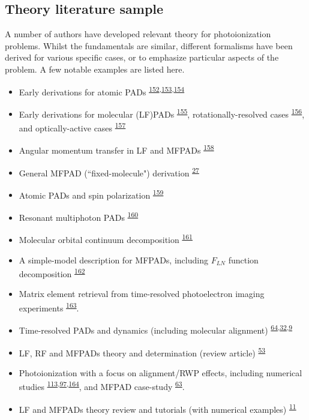 \documentclass[10pt]{article}
\begin{document}

\subsection{Theory literature sample\label{sec:theory-lit}}

A number of authors have developed relevant theory for photoionization problems. Whilst the fundamentals are similar, different formalisms have been derived for various specific cases, or to emphasize particular aspects of the problem. A few notable examples are listed here.

\begin{itemize}
\item Early derivations for atomic PADs \textsuperscript{\hyperref[csl:152]{152},\hyperref[csl:153]{153},\hyperref[csl:154]{154}}
\item Early derivations for molecular (LF)PADs \textsuperscript{\hyperref[csl:155]{155}}, rotationally-resolved cases \textsuperscript{\hyperref[csl:156]{156}}, and optically-active cases \textsuperscript{\hyperref[csl:157]{157}}
\item Angular momentum transfer in LF and MFPADs \textsuperscript{\hyperref[csl:158]{158}} 
\item General MFPAD (``fixed-molecule") derivation \textsuperscript{\hyperref[csl:27]{27}}
\item Atomic PADs and spin polarization \textsuperscript{\hyperref[csl:159]{159}}
\item Resonant multiphoton PADs \textsuperscript{\hyperref[csl:160]{160}}
\item Molecular orbital continuum decomposition \textsuperscript{\hyperref[csl:161]{161}}
\item A simple-model description for MFPADs, including $F_{LN}$ function decomposition \textsuperscript{\hyperref[csl:162]{162}}
\item Matrix element retrieval from time-resolved photoelectron imaging experiments \textsuperscript{\hyperref[csl:163]{163}}.
\item Time-resolved PADs and dynamics (including molecular alignment) \textsuperscript{\hyperref[csl:64]{64},\hyperref[csl:32]{32},\hyperref[csl:9]{9}}
\item LF, RF and MFPADs theory and determination (review article) \textsuperscript{\hyperref[csl:53]{53}}
\item Photoionization with a focus on alignment/RWP effects, including numerical studies \textsuperscript{\hyperref[csl:113]{113},\hyperref[csl:97]{97},\hyperref[csl:164]{164}}, and MFPAD case-study \textsuperscript{\hyperref[csl:63]{63}}.
\item LF and MFPADs theory review and tutorials (with numerical examples) \textsuperscript{\hyperref[csl:11]{11}}
\end{itemize}
\end{document}
